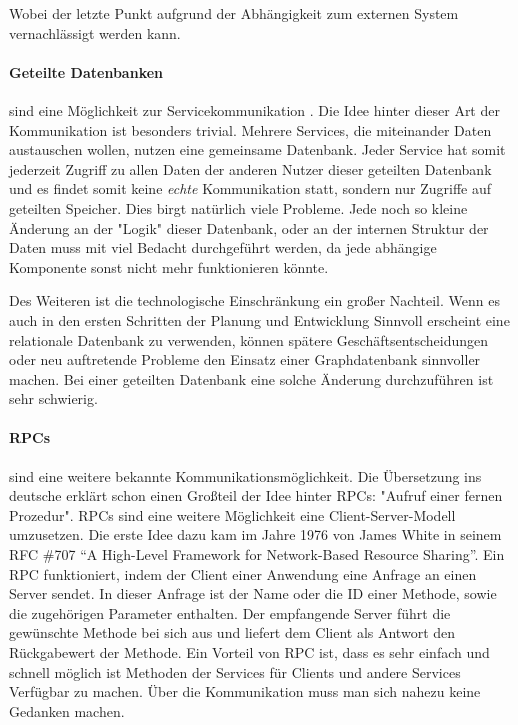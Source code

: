 \documentclass[12pt,a4paper,bibliography=totocnumbered,listof=totocnumbered]{scrartcl}
\begin{document}
Wobei der letzte Punkt aufgrund der Abhängigkeit zum externen System vernachlässigt werden kann.

\paragraph{Geteilte Datenbanken} sind eine Möglichkeit zur Servicekommunikation \cite[S.85]{buildingms}. Die Idee hinter dieser Art der Kommunikation ist besonders trivial. Mehrere Services, die miteinander Daten austauschen wollen, nutzen eine gemeinsame Datenbank. Jeder Service hat somit jederzeit Zugriff zu allen Daten der anderen Nutzer dieser geteilten Datenbank und es findet somit keine \textit{echte} Kommunikation statt, sondern nur Zugriffe auf geteilten Speicher.\cite{shareddb}
Dies birgt natürlich viele Probleme. Jede noch so kleine Änderung an der "Logik" dieser Datenbank, oder an der internen Struktur der Daten muss mit viel Bedacht durchgeführt werden, da jede abhängige Komponente sonst nicht mehr funktionieren könnte.

Des Weiteren ist die technologische Einschränkung ein großer Nachteil. Wenn es auch in den ersten Schritten der Planung und Entwicklung Sinnvoll erscheint eine relationale Datenbank zu verwenden, können spätere Geschäftsentscheidungen oder neu auftretende Probleme den Einsatz einer Graphdatenbank sinnvoller machen. Bei einer geteilten Datenbank eine solche Änderung durchzuführen ist sehr schwierig\cite[S.85]{buildingms}.

\paragraph{\acfp{RPC}}\label{rpcpara} sind eine weitere bekannte Kommunikationsmöglichkeit. Die Übersetzung ins deutsche erklärt schon einen Großteil der Idee hinter \acp{RPC}: "Aufruf einer fernen Prozedur". \acp{RPC} sind eine weitere Möglichkeit eine Client-Server-Modell umzusetzen. Die erste Idee dazu kam im Jahre 1976 von James White in seinem RFC \#707 \enquote{A High-Level Framework for Network-Based Resource Sharing}\cite{white707}. Ein \ac{RPC} funktioniert, indem der Client einer Anwendung eine Anfrage an einen Server sendet. In dieser Anfrage ist der Name oder die ID einer Methode, sowie die zugehörigen Parameter enthalten. Der empfangende Server führt die gewünschte Methode bei sich aus und liefert dem Client als Antwort den Rückgabewert der Methode.
Ein Vorteil von RPC ist, dass es sehr einfach und schnell möglich ist Methoden der Services für Clients und andere Services Verfügbar zu machen. Über die Kommunikation muss man sich nahezu keine Gedanken machen\cite[S.91]{buildingms}.
\end{document}
